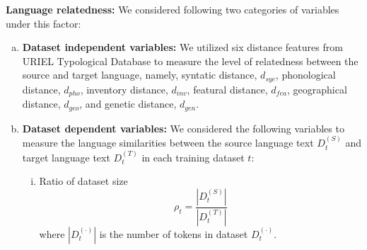 \documentclass[11pt]{article}
\begin{document}
\textbf{Language relatedness:} We considered following two categories of variables under this factor:
\begin{enumerate}[(a)]
    \item \textbf{Dataset independent variables:} We utilized six distance features from URIEL Typological Database to measure the level of relatedness between the source and target language, namely, syntatic distance, $d_{syc}$, phonological distance, $d_{pho}$, inventory distance, $d_{inv}$, featural distance, $d_{fea}$, geographical distance, $d_{geo}$, and genetic distance, $d_{gen}$.
    \item \textbf{Dataset dependent variables:} We considered the following variables to measure the language similarities between the source language text $D_t^{(S)}$ and target language text $D_t^{(T)}$ in each training dataset $t$:
    \begin{enumerate}[(i)]
        \item Ratio of dataset size
        \begin{equation*}
            \rho_t = \frac{|D_t^{(S)}|}{|D_t^{(T)}|}
        \end{equation*}
        where $|D_t^{(\cdot)}|$ is the number of tokens in dataset $D_t^{(\cdot)}$.
        

\end{enumerate}
\end{enumerate}
\end{document}
